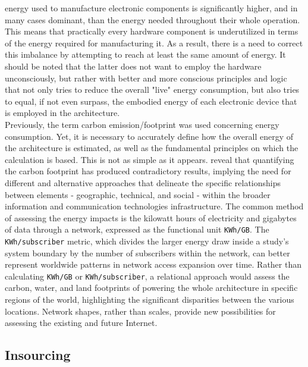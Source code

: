 energy used to manufacture electronic components is significantly higher, and in
many cases dominant, than the energy needed throughout their whole operation\cite{monster_footprint}.
This means that practically every hardware component is underutilized in terms of
the energy required for manufacturing it. As a result, there is a need to correct
this imbalance by attempting to reach at least the same amount of energy. It
should be noted that the latter does not want to employ the hardware
unconsciously, but rather with better and more conscious principles and logic that
not only tries to reduce the overall "live" energy consumption, but also tries
to equal, if not even surpass, the embodied energy of each electronic device
that is employed in the architecture. \\ %
Previously, the term carbon emission/footprint was used concerning energy consumption.
Yet, it is necessary to accurately define how the overall energy of the architecture
is estimated, as well as the fundamental principles on which the calculation is
based. This is not as simple as it appears. \cite{world_wide_web_carbon} reveal
that quantifying the carbon footprint has produced contradictory results, implying
the need for different and alternative approaches that delineate the specific relationships
between elements - geographic, technical, and social - within the broader information
and communication technologies infrastructure. The common method of assessing
the energy impacts is the kilowatt hours of electricity and gigabytes of data
through a network, expressed as the functional unit \texttt{KWh/GB}. The \texttt{KWh/subscriber}
metric, which divides the larger energy draw inside a study's system boundary by
the number of subscribers within the network, can better represent worldwide
patterns in network access expansion over time. Rather than calculating \texttt{KWh/GB}
or \texttt{KWh/subscriber}, a relational approach would assess the carbon, water,
and land footprints of powering the whole architecture in specific regions of
the world, highlighting the significant disparities between the various locations.
Network shapes, rather than scales, provide new possibilities for assessing the
existing and future Internet\cite{world_wide_web_carbon}.

\subsection{Insourcing}
\label{subsec:introduction_principles_insourcing}

